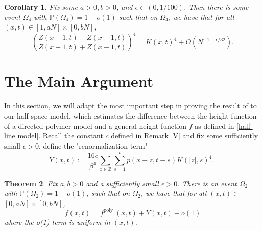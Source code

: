 \documentclass[10pt]{article}
\newtheorem{theorem}{Theorem}[section]
\newtheorem{corollary}[theorem]{Corollary}
\begin{document}
\begin{corollary}
    Fix some $a>0, b>0$, and $\epsilon \in(0,1 / 100)$. Then there is some event $\Omega_{4}$ with $\mathbb{P}\left(\Omega_{4}\right)=1-o(1)$ such that on $\Omega_{4}$, we have that for all $(x, t) \in[1, a N] \times[0, b N]$,
\begin{equation}
    \left(\frac{Z(x+1, t)-Z(x-1, t)}{Z(x+1, t)+Z(x-1, t)}\right)^{4}=K(x, t)^{4}+O\left(N^{-1-\epsilon / 32}\right) .
\end{equation} 
\end{corollary}


\section{The Main Argument}
In this section, we will adapt the most important step in proving the result of \cite{adhikari2022invariance} to our half-space model, which estimates the difference between the height function of a directed polymer model and a general height function $f$ as defined in \eqref{half-line model}. Recall the constant $c$ defined in Remark \ref{V} and fix some sufficiently small $\epsilon > 0$, define the "renormalization term"
\begin{equation}\label{y}
    Y(x, t):=\frac{16 c}{\beta^{4}} \sum_{z \in \mathbb{Z}} \sum_{s=1}^{t} p(x-z, t-s) K(|z|, s)^{4} \text {. }
\end{equation}


\begin{theorem} \label{7.1}
    Fix $a, b>0$ and a sufficiently small $\epsilon > 0$. There is an event $\Omega_{2}$ with $\mathbb{P}\left(\Omega_{2}\right)=1-o(1)$, such that on $\Omega_{2}$, we have that for all $(x, t) \in$ $[0, a N] \times[0, b N]$,
$$
f(x, t)=f^{\text {poly }}(x, t)+Y(x, t)+o(1)
$$
where the o(1) term is uniform in $(x, t)$.
\end{theorem}
\end{document}
